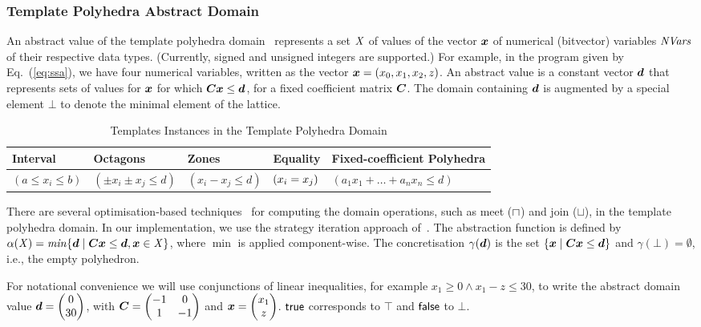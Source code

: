 \subsubsection{Template Polyhedra Abstract Domain}
%
An abstract value of the template polyhedra domain~\cite{sriram}
represents a set $\numconcval$ of values of the vector $\vec{\numvar}$ 
of numerical (bitvector) variables $\numvars$ of their respective
data types. (Currently, signed and unsigned integers are supported.)
For example, in the program given by Eq.~(\ref{eq:ssa}), we have four 
numerical variables, written as the vector $\vec{\numvar} = (x_0,x_1,x_2,z)$.  
An abstract value is a constant vector $\vec{\numabsval}$ that represents 
sets of values for $\vec{\numvar}$ for which 
$\mat{C}\vec{\numvar}\leq\vec{\numabsval}$, for a fixed coefficient 
matrix $\mat{C}$.  The domain containing $\vec{\numabsval}$ is augmented 
by a special element $\bot$ to denote the minimal element of the lattice.  
%
\begin{table}[t]
\small
\begin{center}
{
\begin{tabular}{l|l|l|l|l}
\hline
Interval & Octagons & Zones & Equality & Fixed-coefficient Polyhedra \\ \hline
$(a \leq x_i \leq b)$ & $(\pm x_i \pm x_j \leq d)$ & $(x_i - x_j \leq d)$ & 
  $(x_i=x_j)\Omit{,(x_i \neq x_j)}$ & $(a_1x_1 + \ldots + a_nx_n \leq d)$ \\ 
\hline
\end{tabular}
}
\end{center}
\caption{Templates Instances in the Template Polyhedra Domain}
\label{domain}
\end{table}
%
There are several optimisation-based 
techniques~\cite{sriram,GS07b,BJKS15} for computing the domain operations, 
such as meet ($\meet$) and join ($\sqcup$), in the template polyhedra domain.  
In our implementation, we use the strategy iteration approach of~\cite{BJKS15}.
%
The abstraction function is defined by $\alpha(\numconcval) = \min \{\vec{\numabsval}\mid
\mat{C}\vec{\numvar}\leq\vec{\numabsval}, \vec{\numvar}\in \numconcval\}$, where 
$\min$ is applied component-wise.  The concretisation $\gamma(\vec{\numabsval})$ is the set $\{\vec{\numvar}\mid
\mat{C}\vec{\numvar}\leq\vec{\numabsval}\}$ and $\gamma(\bot)=\emptyset$,
i.e., the empty polyhedron.

For notational convenience we will use conjunctions of linear
inequalities, for example $x_1\geq 0 \wedge x_1-z\leq 30$, to write the
abstract domain value $\vec{\numabsval}=\vecv{0}{30}$,
with $\mat{C}=\qmat{-1}{0}{1}{-1}$ and $\vec{\numvar}=\vecv{x_1}{z}$. 
$\true$ corresponds to $\top$ and $\false$ to $\bot$.

